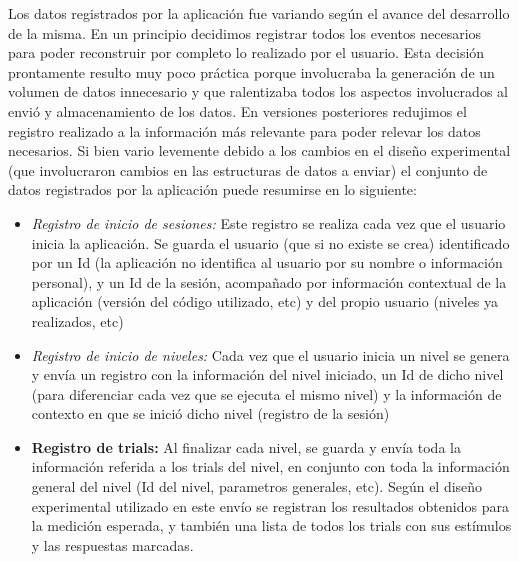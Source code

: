 \documentclass{article}
\begin{document}
    Los datos registrados por la aplicación fue variando según el avance del desarrollo de la misma. En un principio decidimos registrar todos los eventos necesarios para poder reconstruir por completo lo realizado por el usuario. Esta decisión prontamente resulto muy poco práctica porque involucraba la generación de un volumen de datos innecesario y que ralentizaba todos los aspectos involucrados al envió y almacenamiento de los datos. 
    En versiones posteriores redujimos el registro realizado a la información más relevante para poder relevar los datos necesarios. Si bien vario levemente debido a los cambios en el diseño experimental (que involucraron cambios en las estructuras de datos a enviar) el conjunto de datos registrados por la aplicación puede resumirse en lo siguiente:
    \begin{itemize}
        \item \textit{Registro de inicio de sesiones:} Este registro se realiza cada vez que el usuario inicia la aplicación. Se guarda el usuario (que si no existe se crea) identificado por un Id (la aplicación no identifica al usuario por su nombre o información personal), y un Id de la sesión, acompañado por información contextual de la aplicación (versión del código utilizado, etc) y del propio usuario (niveles ya realizados, etc)
        
        \item \textit{Registro de inicio de niveles:} Cada vez que el usuario inicia un nivel se genera y envía un registro con la información del nivel iniciado, un Id de dicho nivel (para diferenciar cada vez que se ejecuta el mismo nivel) y la información de contexto en que se inició dicho nivel (registro de la sesión)
        
        \item \textbf{Registro de trials:} Al finalizar cada nivel, se guarda y envía toda la información referida a los trials del nivel, en conjunto con toda la información general del nivel (Id del nivel, parametros generales, etc). Según el diseño experimental utilizado en este envío se registran los resultados obtenidos para la medición esperada, y también una lista de todos los trials con sus estímulos y las respuestas marcadas. 
    \end{itemize}
    
\end{document}
